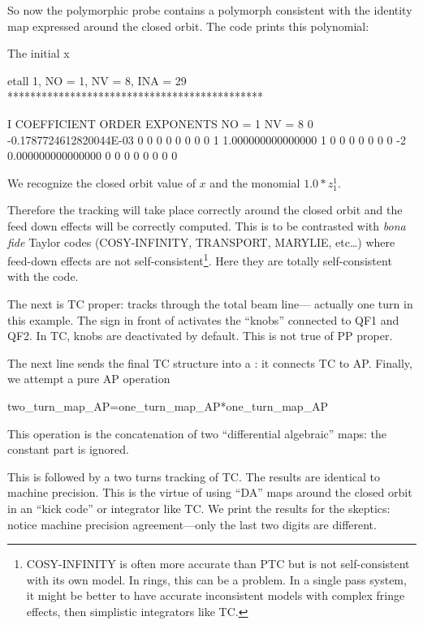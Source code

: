 \documentclass{hitec}     %
\begin{document}
{{{{{{So now the polymorphic probe  contains a polymorph consistent with  the identity map expressed around the closed orbit.  The code prints this polynomial:
\renewcommand{\codefont}{\footnotesize}
\begin{code}
  The initial x

 etall    1, NO =    1, NV =    8, INA =   29
 *********************************************

    I  COEFFICIENT          ORDER   EXPONENTS
      NO =     1      NV =     8
   0 -0.1787724612820044E-03   0  0  0  0  0  0  0  0
   1   1.000000000000000       1  0  0  0  0  0  0  0
    -2   0.000000000000000       0  0  0  0  0  0  0  0
   \end{code} 
We recognize the closed orbit value of $x$ and the monomial     $1.0*z_1^1$.
    
    
    Therefore the tracking will take place correctly around the closed orbit and the feed down effects will be correctly computed. This is to be contrasted with {\it bona fide} Taylor codes (COSY-INFINITY, TRANSPORT, MARYLIE, etc\ldots) where feed-down effects are not self-consistent\footnote{COSY-INFINITY is often more accurate than PTC but is not self-consistent with its own model. In rings, this can be a  problem. In a single pass system, it might be better to have accurate inconsistent models with complex fringe effects, then simplistic integrators like TC.}. Here they are totally self-consistent with the code. 



The next is TC proper:  tracks through the total beam line--- actually one turn in this example. The \vn{+} sign in front of 
   activates the ``knobs'' connected to QF1 and QF2. In TC, knobs are deactivated by default. This is not true of PP proper.
 
 The next line  sends the final TC structure  into a : it connects TC to AP. Finally, we attempt a pure AP operation
\begin{code}
two_turn_map_AP=one_turn_map_AP*one_turn_map_AP 
\end{code}

This operation is  the concatenation of two ``differential algebraic'' maps: the constant part is ignored.

This is followed by a two turns tracking of TC. The results are identical to machine precision. This is the virtue of using ``DA'' maps around the closed orbit in an ``kick code'' or integrator like TC. We print the results for the skeptics: notice machine precision agreement---only the last two digits are different.

}}}}}}
\end{document}
